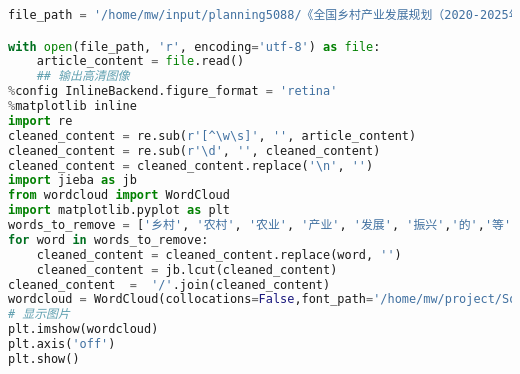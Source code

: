 \begin{lstlisting}[language=python,caption={全国乡村产业发展规划}]
file_path = '/home/mw/input/planning5088/《全国乡村产业发展规划（2020-2025年）》全文.txt'

with open(file_path, 'r', encoding='utf-8') as file:
    article_content = file.read()
    ## 输出高清图像
%config InlineBackend.figure_format = 'retina'
%matplotlib inline
import re
cleaned_content = re.sub(r'[^\w\s]', '', article_content) 
cleaned_content = re.sub(r'\d', '', cleaned_content)     
cleaned_content = cleaned_content.replace('\n', '')
import jieba as jb
from wordcloud import WordCloud
import matplotlib.pyplot as plt
words_to_remove = ['乡村', '农村', '农业', '产业', '发展', '振兴','的','等','和']
for word in words_to_remove:
    cleaned_content = cleaned_content.replace(word, '')
    cleaned_content = jb.lcut(cleaned_content)
cleaned_content  =  '/'.join(cleaned_content)
wordcloud = WordCloud(collocations=False,font_path='/home/mw/project/SourceHanSansSC-Regular.ttf', width=3000, height=2000, margin=2,background_color='white').generate(cleaned_content)
# 显示图片 
plt.imshow(wordcloud) 
plt.axis('off')
plt.show()

\end{lstlisting}
